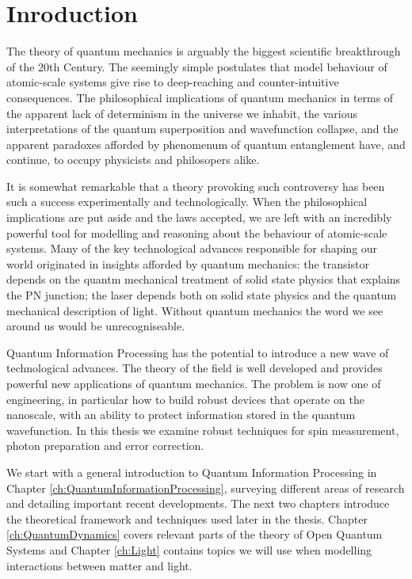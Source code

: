 \chapter{Inroduction} 
\label{ch:Motivation}

The theory of quantum mechanics is arguably the biggest scientific breakthrough of the 20th Century. The seemingly simple postulates that model behaviour of atomic-scale systems give rise to deep-reaching and counter-intuitive consequences. The philosophical implications of quantum mechanics in terms of the apparent lack of determinism in the universe we inhabit, the various interpretations of the quantum superposition and wavefunction collapse, and the apparent paradoxes afforded by phenomenum of quantum entanglement have, and continue, to occupy physicists and philosopers alike.

It is somewhat remarkable that a theory provoking such controversy has been such a success experimentally and technologically. When the philosophical implications are put aside and the laws accepted, we are left with an incredibly powerful tool for modelling and reasoning about the behaviour of atomic-scale systems. Many of the key technological advances responsible for shaping our world originated in insights afforded by quantum mechanics: the transistor depends on the quantm mechanical treatment of solid state physics that explains the PN junction; the laser depends both on solid state physics and the quantum mechanical description of light. Without quantum mechanics the word we see around us would be unrecogniseable.

Quantum Information Processing has the potential to introduce a new wave of technological advances. The theory of the field is well developed and provides  powerful new applications of quantum mechanics. The problem is now one of engineering, in particular how to build robust devices that operate on the nanoscale, with an ability to protect information stored in the quantum wavefunction. In this thesis we examine robust techniques for spin measurement, photon preparation and error correction.

We start with a general introduction to Quantum Information Processing in Chapter \ref{ch:QuantumInformationProcessing}, surveying different areas of research and detailing important recent developments. The next two chapters introduce the theoretical framework and techniques used later in the thesis. Chapter \ref{ch:QuantumDynamics} covers relevant parts of the theory of Open Quantum Systems and Chapter \ref{ch:Light} contains topics we will use when modelling interactions between matter and light.

